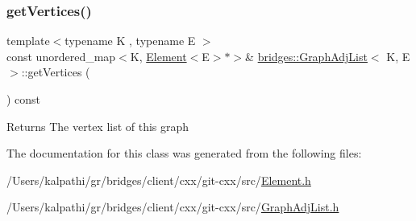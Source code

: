 \subsubsection{\texorpdfstring{get\+Vertices()}{getVertices()}}
{\footnotesize\ttfamily template$<$typename K , typename E $>$ \\
const unordered\+\_\+map$<$K, \hyperlink{classbridges_1_1_element}{Element}$<$E$>$$\ast$$>$\& \hyperlink{classbridges_1_1_graph_adj_list}{bridges\+::\+Graph\+Adj\+List}$<$ K, E $>$\+::get\+Vertices (\begin{DoxyParamCaption}{ }\end{DoxyParamCaption}) const\hspace{0.3cm}{\ttfamily [inline]}}

\begin{DoxyReturn}{Returns}
The vertex list of this graph 
\end{DoxyReturn}


The documentation for this class was generated from the following files\+:\begin{DoxyCompactItemize}
\item 
/\+Users/kalpathi/gr/bridges/client/cxx/git-\/cxx/src/\hyperlink{_element_8h}{Element.\+h}\item 
/\+Users/kalpathi/gr/bridges/client/cxx/git-\/cxx/src/\hyperlink{_graph_adj_list_8h}{Graph\+Adj\+List.\+h}\end{DoxyCompactItemize}
